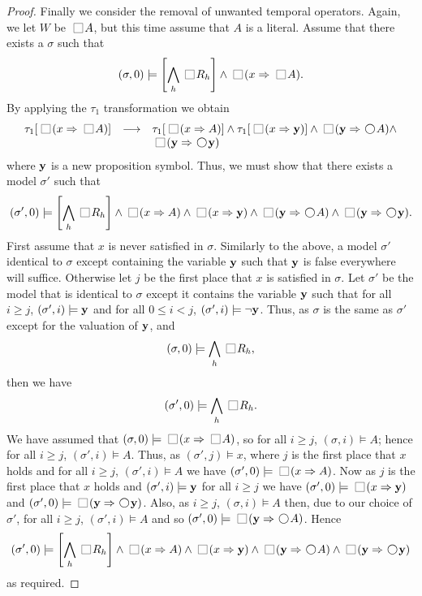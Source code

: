 \documentclass[nohyperref]{acmtrans2f}
\newcommand{\always}{\raisebox{-.2ex}{
                           \mbox{\unitlength=0.9ex
                           \begin{picture}(2,2)
                           \linethickness{0.06ex}
                           \put(0,0){\line(1,0){2}}
                           \put(0,2){\line(1,0){2}}
                           \put(0,0){\line(0,1){2}}
                           \put(2,0){\line(0,1){2}}
                           \end{picture}}}
                          \,}
\newcommand{\next}{\!\raisebox{-.2ex}{ %
                        \mbox{\unitlength=0.9ex
                        \begin{picture}(2,2)
                        \linethickness{0.06ex}
                        \put(1,1){\circle{2}} %
                        \end{picture}}}       %
                        \,}
\let\imp=\Rightarrow
\begin{document}
\begin{proof}
Finally we consider the removal of unwanted temporal operators. Again,
we let $W$ be $\always A$, but this time assume that $A$ is a
literal. Assume that there exists a $\sigma$ such that
$$
(\sigma, 0) \models \left[\bigwedge_h \always R_h\right] \land \always
(x \imp \always A).
$$
By applying the $\tau_1$ transformation we obtain
$$
\begin{array}{rcl}
\tau_1[\always(x \imp \always A)] & \longrightarrow & \tau_1[\always(x
\imp A)] \land \tau_1[\always(x \imp {\bf y})] \land \always({\bf y} \imp \next A)
\land \\
& & \always({\bf y} \imp \next {\bf y})
\end{array}
$$
where ${\bf y}$ is a new proposition symbol.
Thus, we must show that there exists a model $\sigma'$ such that 
$$
(\sigma', 0) \models \left[\bigwedge_h \always R_h\right] \land
\always(x \imp A) \land \always(x \imp {\bf y}) \land \always({\bf y} \imp \next
A) \land \always({\bf y} \imp \next {\bf y}).
$$
First assume that $x$ is never satisfied in $\sigma$. 
Similarly to the above, a model $\sigma'$ identical to $\sigma$ except
containing the variable ${\bf y}$ such that ${\bf y}$ is false everywhere 
will suffice.
Otherwise let $j$ be the first place that $x$ is satisfied in $\sigma$.
Let $\sigma'$ be the model
that is identical to $\sigma$ except it contains the variable ${\bf y}$ such
that for all $i \geq j$, $(\sigma',i) \models {\bf y}$ and for all $0 \leq i < j$,
$(\sigma',i) \models \neg {\bf y}$. Thus, as $\sigma$ is the same as
$\sigma'$ except for the valuation of ${\bf y}$, and 
$$(\sigma, 0) \models \bigwedge_h \always R_h,$$
%
then we have 
$$(\sigma', 0)\models \bigwedge_h \always R_h.$$
%
We have assumed that $(\sigma, 0) \models \always (x \imp \always A)$,
so for all $i \geq j$, $(\sigma,i) \models A$; hence for all $i \geq j$,
$(\sigma',i) \models A$. Thus, as $(\sigma',j) \models x$, where $j$
is the first place that $x$ holds and for all $i \geq j$, $(\sigma',i)
\models A$ we have $(\sigma', 0) \models \always (x \imp A)$. Now as
$j$ is the first place that $x$ holds and $(\sigma',i) \models {\bf y}$ for
all $i \geq j$ we have $(\sigma',0) \models \always(x \imp {\bf y})$ and
$(\sigma',0) \models \always({\bf y} \imp \next {\bf y})$. Also, as $i \geq j$,
$(\sigma,i) \models A$ then, due to our choice of $\sigma'$, for all
$i \geq j$, $(\sigma',i) \models A$ and so $(\sigma',0) \models
\always ({\bf y} \imp \next A)$. Hence
$$
(\sigma', 0) \models \left[\bigwedge_h \always R_h\right] \land
\always(x \imp A) \land \always(x \imp {\bf y}) \land \always({\bf y} \imp \next
A) \land \always({\bf y} \imp \next {\bf y})
$$
as required.
\end{proof}
\end{document}
